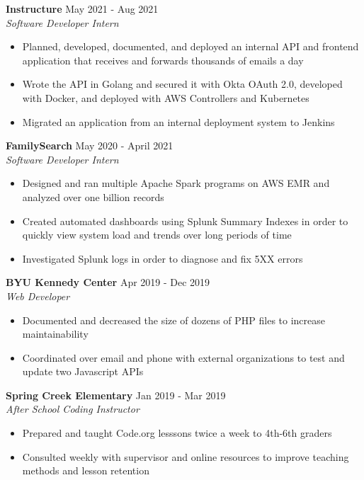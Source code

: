 \documentclass[letterpaper]{article}
\begin{document}
\textbf{Instructure} \hfill May 2021 - Aug 2021\\
\textit{Software Developer Intern}\\
\vspace{-1mm}
\begin{itemize} \itemsep 1pt
	\item Planned, developed, documented, and deployed an internal API and frontend  application that receives and forwards thousands of emails a day
	\item Wrote the API in Golang and secured it with Okta OAuth 2.0, developed with Docker, and deployed with AWS Controllers and Kubernetes
	\item Migrated an application from an internal deployment system to Jenkins
\end{itemize}
\textbf{FamilySearch} \hfill May 2020 - April 2021\\
\textit{Software Developer Intern}\\
\vspace{-1mm}
\begin{itemize} \itemsep 1pt
	\item Designed and ran multiple Apache Spark programs on AWS EMR and analyzed over one billion records
	\item Created automated dashboards using Splunk Summary Indexes in order to quickly view system load and trends over long periods of time
	\item Investigated Splunk logs in order to diagnose and fix 5XX errors
    
\end{itemize}
\textbf{BYU Kennedy Center} \hfill Apr 2019 - Dec 2019\\
\textit{Web Developer}\\
\vspace{-1mm}
\begin{itemize} \itemsep 1pt
	\item Documented and decreased the size of dozens of PHP files to increase maintainability
	\item Coordinated over email and phone with external organizations to test and update two Javascript APIs
\end{itemize}
\textbf{Spring Creek Elementary} \hfill Jan 2019 - Mar 2019\\
\textit{After School Coding Instructor}\\
\vspace{-1mm}
\begin{itemize} \itemsep 1pt
	\item Prepared and taught Code.org lesssons twice a week to 4th-6th graders
	\item Consulted weekly with supervisor and online resources to improve teaching methods and lesson retention
\end{itemize}
\end{document}
